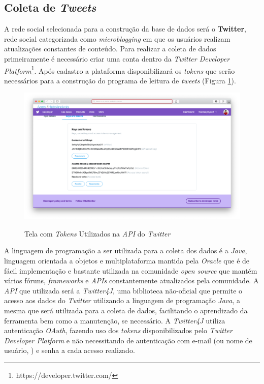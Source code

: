 \subsection{Coleta de \textit{Tweets}}
A rede social selecionada para a construção da base de dados será o \textbf{Twitter}, rede social categorizada como \textit{microblogging} em que os usuários realizam atualizações constantes de conteúdo. Para realizar a coleta de dados primeiramente é necessário criar uma conta dentro da \textit{Twitter Developer Platform}\footnote{https://developer.twitter.com/}. Após cadastro a plataforma disponibilizará os \textit{tokens} que serão necessários para a construção do programa de leitura de \textit{tweets} (Figura \ref{fig:twitterdeveloperplatform}).

\begin{figure}[!h]
\centering 
\caption{Tela com \textit{Tokens} Utilizados na \textit{API} do \textit{Twitter}}
\includegraphics[scale=0.3]{imagens/twitterdeveloperplatform.png}
\label{fig:twitterdeveloperplatform}
\end{figure}

A linguagem de programação a ser utilizada para a coleta dos dados é a \textit{Java}, linguagem orientada a objetos e multiplataforma mantida pela \textit{Oracle} que é de fácil implementação e bastante utilizada na comunidade \textit{open source} que mantém vários fóruns, \textit{frameworks} e \textit{APIs} constantemente atualizados pela comunidade. A \textit{API} que utilizada será a \textit{Twitter4J}, uma biblioteca não-oficial que permite o acesso aos dados do \textit{Twitter} utilizando a linguagem de programação \textit{Java}, a mesma que será utilizada para a coleta de dados, facilitando o aprendizado da ferramenta bem como a manutenção, se necessário. A \textit{Twitter4J} utiliza autenticação \textit{OAuth}, fazendo uso dos \textit{tokens} disponibilizados pelo \textit{Twitter Developer Platform} e não necessitando de autenticação com e-mail (ou nome de usuário, ) e senha a cada acesso realizado. 

